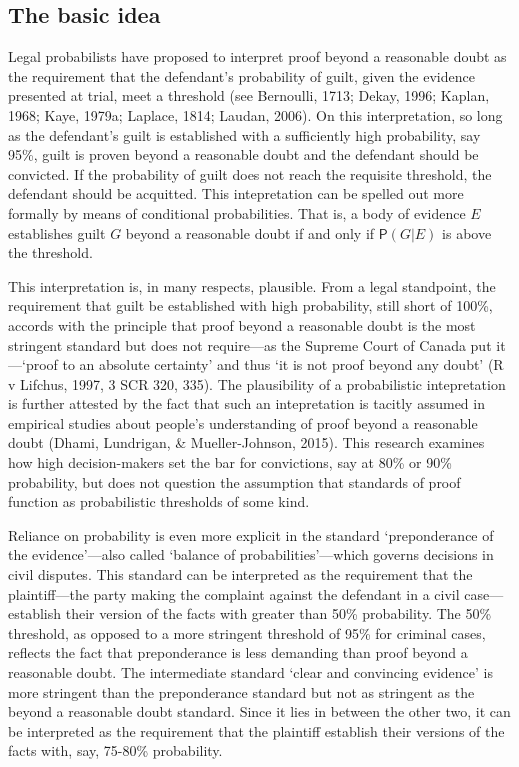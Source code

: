 \documentclass[10pt,dvipsnames,enabledeprecatedfontcommands]{scrartcl}
\newcommand{\pr}[1]{\mathsf{P}(#1)}
\begin{document}
\hypertarget{the-basic-idea}{%
\subsection{The basic idea}\label{the-basic-idea}}

Legal probabilists have proposed to interpret proof beyond a reasonable
doubt as the requirement that the defendant's probability of guilt,
given the evidence presented at trial, meet a threshold (see Bernoulli,
1713; Dekay, 1996; Kaplan, 1968; Kaye, 1979a; Laplace, 1814; Laudan,
2006). On this interpretation, so long as the defendant's guilt is
established with a sufficiently high probability, say 95\%, guilt is
proven beyond a reasonable doubt and the defendant should be convicted.
If the probability of guilt does not reach the requisite threshold, the
defendant should be acquitted. This intepretation can be spelled out
more formally by means of conditional probabilities. That is, a body of
evidence \(E\) establishes guilt \(G\) beyond a reasonable doubt if and
only if \(\pr{G\vert E}\) is above the threshold.

This interpretation is, in many respects, plausible. From a legal
standpoint, the requirement that guilt be established with high
probability, still short of 100\%, accords with the principle that proof
beyond a reasonable doubt is the most stringent standard but does not
require---as the Supreme Court of Canada put it---`proof to an absolute
certainty' and thus `it is not proof beyond any doubt' (R v Lifchus,
1997, 3 SCR 320, 335). The plausibility of a probabilistic intepretation
is further attested by the fact that such an intepretation is tacitly
assumed in empirical studies about people's understanding of proof
beyond a reasonable doubt (Dhami, Lundrigan, \& Mueller-Johnson, 2015).
This research examines how high decision-makers set the bar for
convictions, say at 80\% or 90\% probability, but does not question the
assumption that standards of proof function as probabilistic thresholds
of some kind.

Reliance on probability is even more explicit in the standard
`preponderance of the evidence'---also called `balance of
probabilities'---which governs decisions in civil disputes. This
standard can be interpreted as the requirement that the plaintiff---the
party making the complaint against the defendant in a civil
case---establish their version of the facts with greater than 50\%
probability. The 50\% threshold, as opposed to a more stringent
threshold of 95\% for criminal cases, reflects the fact that
preponderance is less demanding than proof beyond a reasonable doubt.
The intermediate standard `clear and convincing evidence' is more
stringent than the preponderance standard but not as stringent as the
beyond a reasonable doubt standard. Since it lies in between the other
two, it can be interpreted as the requirement that the plaintiff
establish their versions of the facts with, say, 75-80\% probability.
\end{document}
